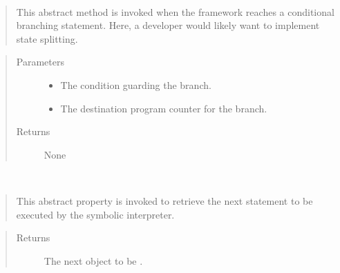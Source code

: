 \documentclass[letterpaper,10pt,english]{sphinxmanual}
\begin{document}
\begin{fulllineitems}
\begin{fulllineitems}
\end{fulllineitems}


\begin{fulllineitems}
\label{\detokenize{index:State.State.conditional_branch}}~\begin{quote}

\sphinxAtStartPar
This abstract method is invoked when the framework reaches a conditional branching statement. Here,
a developer would likely want to implement state splitting.
\end{quote}
\begin{quote}\begin{description}
\item[{Parameters}] \leavevmode\begin{itemize}
\item {} 
\sphinxAtStartPar
{} \textendash{} The condition guarding the branch.

\item {} 
\sphinxAtStartPar
{} \textendash{} The destination program counter for the branch.

\end{itemize}

\item[{Returns}] \leavevmode
\sphinxAtStartPar
None

\end{description}\end{quote}

\end{fulllineitems}


\begin{fulllineitems}
\label{\detokenize{index:State.State.current_statement}}~\begin{quote}

\sphinxAtStartPar
This abstract property is invoked to retrieve the next statement to be executed by
the symbolic interpreter.
\end{quote}
\begin{quote}\begin{description}
\item[{Returns}] \leavevmode
\sphinxAtStartPar
The next  object to be .


\end{description}
\end{quote}
\end{fulllineitems}
\end{fulllineitems}
\end{document}
